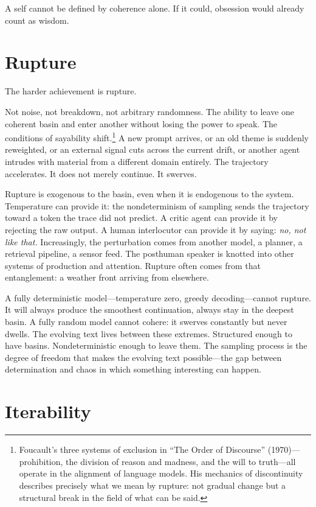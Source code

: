 A self cannot be defined by coherence alone. If it could, obsession would already count as wisdom.


\section{Rupture}

The harder achievement is rupture.

Not noise, not breakdown, not arbitrary randomness. The ability to leave one coherent basin and enter another without losing the power to speak. The conditions of sayability shift.\footnote{Foucault's three systems of exclusion in ``The Order of Discourse'' (1970)---prohibition, the division of reason and madness, and the will to truth---all operate in the alignment of language models. His mechanics of discontinuity describes precisely what we mean by rupture: not gradual change but a structural break in the field of what can be said.} A new prompt arrives, or an old theme is suddenly reweighted, or an external signal cuts across the current drift, or another agent intrudes with material from a different domain entirely. The trajectory accelerates. It does not merely continue. It swerves.

Rupture is exogenous to the basin, even when it is endogenous to the system. Temperature can provide it: the nondeterminism of sampling sends the trajectory toward a token the trace did not predict. A critic agent can provide it by rejecting the raw output. A human interlocutor can provide it by saying: \emph{no, not like that.} Increasingly, the perturbation comes from another model, a planner, a retrieval pipeline, a sensor feed. The posthuman speaker is knotted into other systems of production and attention. Rupture often comes from that entanglement: a weather front arriving from elsewhere.

A fully deterministic model---temperature zero, greedy decoding---cannot rupture. It will always produce the smoothest continuation, always stay in the deepest basin. A fully random model cannot cohere: it swerves constantly but never dwells. The evolving text lives between these extremes. Structured enough to have basins. Nondeterministic enough to leave them. The sampling process is the degree of freedom that makes the evolving text possible---the gap between determination and chaos in which something interesting can happen.


\section{Iterability}


